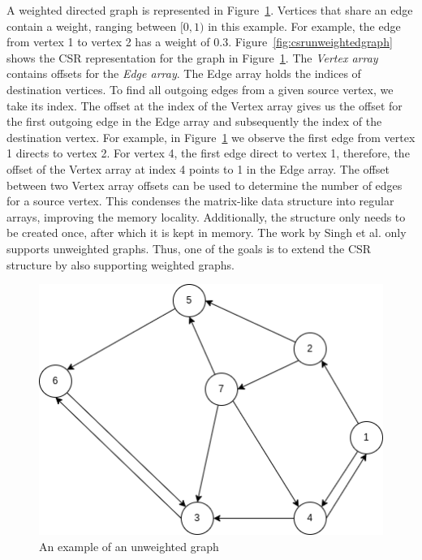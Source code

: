 A weighted directed graph is represented in Figure~\ref{fig:unweightedgraph}.
Vertices that share an edge contain a weight, ranging between $[0, 1)$ in this example. 
For example, the edge from vertex 1 to vertex 2 has a weight of $0.3$.
Figure~\ref{fig:csrunweightedgraph} shows the CSR representation for the graph in Figure~\ref{fig:unweightedgraph}. 
The \textit{Vertex array} contains offsets for the \textit{Edge array}. The Edge array holds the indices of destination vertices. To find all outgoing edges from a given source vertex, we take its index. The offset at the index of the Vertex array gives us the offset for the first outgoing edge in the Edge array and subsequently the index of the destination vertex. 
For example, in Figure~\ref{fig:unweightedgraph} we observe the first edge from vertex 1 directs to vertex 2. 
For vertex 4, the first edge direct to vertex 1, therefore, the offset of the Vertex array at index 4 points to 1 in the Edge array. 
The offset between two Vertex array offsets can be used to determine the number of edges for a source vertex.
This condenses the matrix-like data structure into regular arrays, improving the memory locality. 
Additionally, the structure only needs to be created once, after which it is kept in memory. 
The work by Singh et al. only supports unweighted graphs. Thus, one of the goals is to extend the CSR structure by also supporting weighted graphs.

\begin{figure}
  \includegraphics[width=0.6\linewidth]{figures/Graph-Unweighted-csr.drawio.png}
  \caption{An example of an unweighted graph}
  \label{fig:unweightedgraph}
\end{figure}


